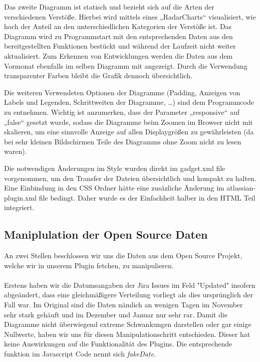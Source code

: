 \documentclass[a4paper,12pt,]{article}
\begin{document}
Das zweite Diagramm ist statisch und bezieht sich auf die Arten der verschiedenen Verstöße. Hierbei wird mittels eines „RadarCharts“ visualisiert, wie hoch der Anteil an den unterschiedlichen Kategorien der Verstöße ist. Das Diagramm wird zu Programmstart mit den entsprechenden Daten aus den bereitgestellten Funktionen bestückt und während der Laufzeit nicht weiter aktualisiert. Zum Erkennen von Entwicklungen werden die Daten aus dem Vormonat ebenfalls im selben Diagramm mit angezeigt. Durch die Verwendung transparenter Farben bleibt die Grafik dennoch übersichtlich.

Die weiteren Verwendeten Optionen der Diagramme (Padding, Anzeigen von Labels und Legenden, Schrittweiten der Diagramme, …) sind dem Programmcode zu entnehmen.
Wichtig ist anzumerken, dass der Parameter „responsive“ auf „false“ gesetzt wurde, sodass die Diagramme beim Zoomen im Browser nicht mit skalieren, um eine sinnvolle Anzeige auf allen Displaygrößen zu gewährleisten (da bei sehr kleinen Bildschirmen Teile des Diagramms ohne Zoom nicht zu lesen waren).

Die notwendigen Änderungen im Style wurden direkt im gadget.xml file vorgenommen, um den Transfer der Dateien übersichtlich und kompakt zu halten. Eine Einbindung in den CSS Ordner hätte eine zusäzliche Änderung im atlassian-plugin.xml file bedingt. Daher wurde es der Einfachheit halber in den HTML Teil integriert.

\subsection{Maniplulation der Open Source Daten}
An zwei Stellen beschlossen wir uns die Daten aus dem Open Source Projekt, welche wir in unserem Plugin fetchen, zu manipulieren.

\paragraph{}Erstens haben wir die Datumsangaben der Jira Issues im Feld "Updated" insofern abgeändert, dass eine gleichmäßigere Verteilung vorliegt als dies ursprünglich der Fall war. Im Original sind die Daten nämlich an wenigen Tagen im November sehr stark gehäuft und im Dezember und Januar nur sehr rar. Damit die Diagramme nicht überwiegend extreme Schwankungen darstellen oder gar einige Nullwerte, haben wir uns für diesen Manipulationschritt entschieden. Dieser hat keine Auswirkungen auf die Funktionalität des Plugins. Die entsprechende funktion im Javascript Code nennt sich \textit{fakeDate}.
\end{document}
